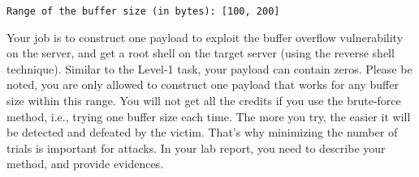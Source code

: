 \begin{lstlisting}
Range of the buffer size (in bytes): [100, 200]
\end{lstlisting}
 

Your job is to construct one payload to exploit the buffer overflow
vulnerability on the server, and get a root shell on the target server (using
the reverse shell technique). 
\ifdefined\arm
Similar to the Level-1 task, your payload can contain zeros. 
\fi
Please be noted, you are only allowed 
to construct one payload that works for any buffer size 
within this range.  You will not get all the credits if you 
use the brute-force method, i.e., trying one buffer size
each time. The more you try, the easier it will be detected 
and defeated by the victim. That's why minimizing the number 
of trials is important for attacks. 
In your lab report, you need to describe your method, 
and provide evidences.


